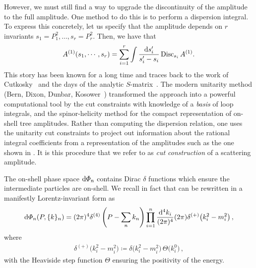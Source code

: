 However, we must still find a way to upgrade the discontinuity of the amplitude to the
full amplitude. One method to do this is to perform a dispersion integral. To
express this concretely, let us specify that the amplitude depends on $r$
invariants $s_1 = P_1^2,\ldots,s_r = P_r^2$. Then, we have that 
\begin{equation}
  A^{(1)}(s_1,\cdots,s_r) = \sum_{i=1}^r \int \frac{\mathrm{d} s'_i}{s_i'-s_i} \, {\rm Disc}_{s_i} \,A^{(1)}.
  \label{eq:dispersion}
\end{equation}
This story has been known for a long time and traces back to the work of
Cutkosky~\cite{ch3_Cutkosky:1960sp} and the days of the analytic $S$-matrix~\cite{ch3_Eden:1966dnq}.
The modern unitarity method (Bern, Dixon, Dunbar, Kosower~\cite{ch3_Bern:1994zx})
transformed the approach into a powerful computational tool by the cut
constraints with knowledge of a \textit{basis} of loop integrals, and the
spinor-helicity method for the compact representation of on-shell tree
amplitudes. Rather than computing the dispersion relation, one uses the
unitarity cut constraints to project out information about the rational
integral coefficients from a representation of the amplitudes such as the one
shown in . It is this procedure that we refer to as
\textit{cut construction} of a scattering amplitude.

The on-shell phase space $\d\Phi_n$ contains Dirac $\delta$ functions which
ensure the intermediate particles are on-shell. We recall in fact that
 can be rewritten in a manifestly Lorentz-invariant form as
\begin{align}
\d\Phi_n(P, \{k\}_n) = (2\pi)^4 \delta^{(4)}\left( P-\sum_n k_n \right) \prod_{i=1}^n \frac{\d^4 k_i}{(2\pi)^4 } (2\pi) \delta^{(+)}\bigl(k_i^2-m_i^2 \bigr) \,,
\end{align} 
where
\begin{align}
 \delta^{(+)}\bigl(k_i^2-m_i^2 \bigr) \coloneqq  \delta \bigl(k_i^2-m_i^2 \bigr) \, \Theta\bigl(k_i^0\bigr)\,,
\end{align}
with the Heaviside step function $\Theta$ ensuring the positivity of the energy.

